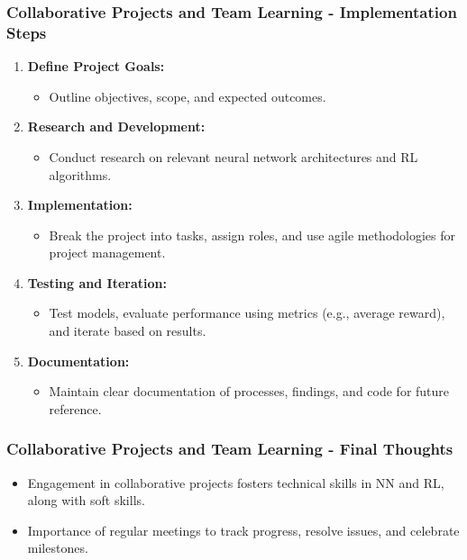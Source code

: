 \documentclass[aspectratio=169]{beamer}
\begin{document}
\begin{frame}[fragile]
    \frametitle{Collaborative Projects and Team Learning - Implementation Steps}
    \begin{enumerate}
        \item \textbf{Define Project Goals:}
        \begin{itemize}
            \item Outline objectives, scope, and expected outcomes.
        \end{itemize}
        
        \item \textbf{Research and Development:}
        \begin{itemize}
            \item Conduct research on relevant neural network architectures and RL algorithms.
        \end{itemize}

        \item \textbf{Implementation:}
        \begin{itemize}
            \item Break the project into tasks, assign roles, and use agile methodologies for project management.
        \end{itemize}

        \item \textbf{Testing and Iteration:}
        \begin{itemize}
            \item Test models, evaluate performance using metrics (e.g., average reward), and iterate based on results.
        \end{itemize}

        \item \textbf{Documentation:}
        \begin{itemize}
            \item Maintain clear documentation of processes, findings, and code for future reference.
        \end{itemize}
    \end{enumerate}
\end{frame}

\begin{frame}[fragile]
    \frametitle{Collaborative Projects and Team Learning - Final Thoughts}
    \begin{itemize}
        \item Engagement in collaborative projects fosters technical skills in NN and RL, along with soft skills.
        \item Importance of regular meetings to track progress, resolve issues, and celebrate milestones.
    \end{itemize}
\end{frame}
\end{document}
